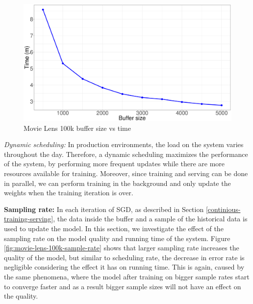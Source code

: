 \documentclass{vldb}
\begin{document}
\begin{figure}[H]
\centering
\includegraphics[width=\columnwidth]{../images/experiment-results/movie-lens-100k-buffer-time-improved.eps}
\caption{Movie Lens 100k buffer size vs time}
\label{fig:movie-lens-100k-buffer-size-time}
\end{figure}

\textit{Dynamic scheduling:} In production environments, the load on the system varies throughout the day. 
Therefore, a dynamic scheduling maximizes the performance of the system, by performing more frequent updates while there are more resources available for training. 
Moreover, since training and serving can be done in parallel, we can perform training in the background and only update the weights when the training iteration is over. 

\textbf{Sampling rate:} In each iteration of SGD, as described in Section \ref{continious-training-serving}, the data inside the buffer and a sample of the historical data is used to update the model.
In this section, we investigate the effect of the sampling rate on the model quality and running time of the system.
Figure \ref{fig:movie-lens-100k-sample-rate} shows that larger sampling rate increases the quality of the model, but similar to scheduling rate, the decrease in error rate is negligible considering the effect it has on running time. 
This is again, caused by the same phenomena, where the model after training on bigger sample rates start to converge faster and as a result bigger sample sizes will not have an effect on the quality.
 
\end{document}
